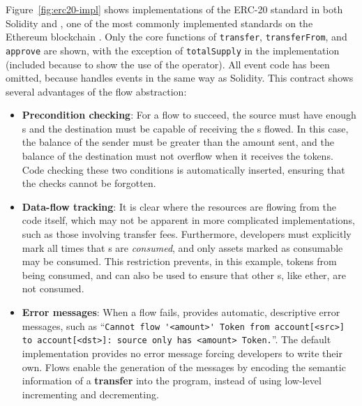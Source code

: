 \documentclass[dvipsnames, usenames, sigconf]{acmart}
\begin{document}
Figure~\ref{fig:erc20-impl} shows implementations of the ERC-20  standard in both Solidity and \langName, one of the most commonly implemented standards on the Ethereum blockchain .
Only the core functions of \lstinline{transfer}, \lstinline{transferFrom}, and \lstinline{approve} are shown, with the exception of \lstinline{totalSupply} in the \langName implementation (included because to show the use of the \total operator).
All event code has been omitted, because \langName handles events in the same way as Solidity.
This contract shows several advantages of the flow abstraction:
\begin{itemize}
    \item \textbf{Precondition checking}: For a flow to succeed, the source must have enough \assetTxt{}s and the destination must be capable of receiving the \assetTxt{}s flowed.
        In this case, the balance of the sender must be greater than the amount sent, and the balance of the destination must not overflow when it receives the tokens.
        Code checking these two conditions is automatically inserted, ensuring that the checks cannot be forgotten.
    \item \textbf{Data-flow tracking}: It is clear where the resources are flowing from the code itself, which may not be apparent in more complicated implementations, such as those involving transfer fees.
        Furthermore, developers must explicitly mark all times that \assetTxt{}s are \emph{consumed}, and only assets marked as consumable may be consumed.
        This restriction prevents, in this example, tokens from being consumed, and can also be used to ensure that other \assetTxt{}s, like ether, are not consumed.
    \item \textbf{Error messages}: When a flow fails, \langName provides  automatic, descriptive error messages, such as ``\lstinline{Cannot flow '<amount>' Token from account[<src>] to account[<dst>]: source only has <amount> Token.}''.
        The default implementation provides no error message forcing developers to write their own.
        Flows enable the generation of the messages by encoding the semantic information of a \textbf{transfer} into the program, instead of using low-level incrementing and decrementing.
\end{itemize}
\end{document}
